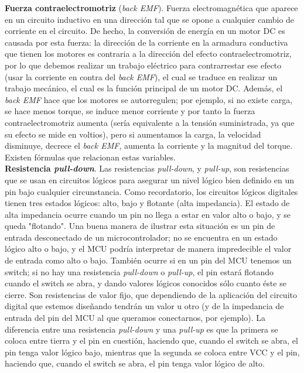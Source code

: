 \documentclass[12pt]{article}
\begin{document}
	\noindent \textbf{\large Fuerza contraelectromotriz} (\textit{back EMF}). Fuerza electromagnética que aparece en un circuito inductivo en una dirección tal que se opone a cualquier cambio de corriente en el circuito. De hecho, la conversión de energía en un motor DC es causada por esta fuerza: la dirección de la corriente en la armadura conductiva que tienen los motores es contraria a la dirección del efecto contraelectromotriz, por lo que debemos realizar un trabajo eléctrico para contrarrestar ese efecto (usar la corriente en contra del \textit{back EMF}), el cual se traduce en realizar un trabajo mecánico, el cual es la función principal de un motor DC. Además, el \textit{back EMF} hace que los motores se autorregulen; por ejemplo, si no existe carga, se hace menos torque, se induce menor corriente y por tanto la fuerza contraelectromotriz aumenta (sería equivalente a la tensión suministrada, ya que su efecto se mide en voltios), pero si aumentamos la carga, la velocidad disminuye, decrece el \textit{back EMF}, aumenta la corriente y la magnitud del torque. Existen fórmulas que relacionan estas variables.\\
	
	\noindent \textbf{\large Resistencia \textit{pull-down}}. Las resistencias \textit{pull-down}, y \textit{pull-up}, son resistencias que se usan en circuitos lógicos para asegurar un nivel lógico bien definido en un pin bajo cualquier circunstancia. Como recordatorio, los circuitos lógicos digitales tienen tres estados lógicos: alto, bajo y flotante (alta impedancia). El estado de alta impedancia ocurre cuando un pin no llega a estar en valor alto o bajo, y se queda "flotando". Una buena manera de ilustrar esta situación es un pin de entrada desconectado de un microcontrolador; no se encuentra en un estado lógico alto o bajo, y el MCU podría interpretar de manera impredecible el valor de entrada como alto o bajo. También ocurre si en un pin del MCU tenemos un switch; si no hay una resistencia \textit{pull-down} o \textit{pull-up}, el pin estará flotando cuando el switch se abra, y dando valores lógicos conocidos sólo cuanto éste se cierre. Son resistencias de valor fijo, que dependiendo de la aplicación del circuito digital que estemos diseñando tendrán un valor u otro (y de la impedancia de entrada del pin del MCU al que queramos conectarnos, por ejemplo). La diferencia entre una resistencia \textit{pull-down} y una \textit{pull-up} es que la primera se coloca entre tierra y el pin en cuestión, haciendo que, cuando el switch se abra, el pin tenga valor lógico bajo, mientras que la segunda se coloca entre VCC y el pin, haciendo que, cuando el switch se abra, el pin tenga valor lógico de alto.\\ 
	
\end{document}

